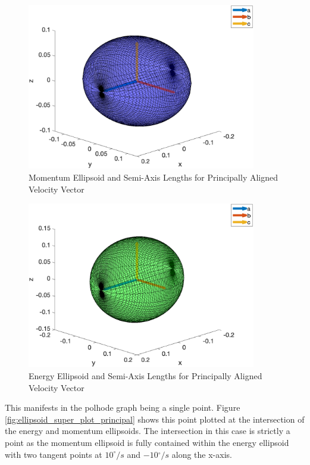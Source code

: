 \begin{figure}[H]
    \centering
    \includegraphics[width = 10cm]{Images/momentum_axes_principal.png}
    \caption{Momentum Ellipsoid and Semi-Axis Lengths for Principally Aligned Velocity Vector}
    \label{fig:momentum_axis_verification_princ}
\end{figure}

\begin{figure}[H]
    \centering
    \includegraphics[width = 10cm]{Images/energy_axes_principal.png}
    \caption{Energy Ellipsoid and Semi-Axis Lengths for Principally Aligned Velocity Vector}
    \label{fig:energy_axis_verification_princ}
\end{figure}

This manifests in the polhode graph being a single point. Figure \ref{fig:ellipsoid_super_plot_principal} shows this point plotted at the intersection of the energy and momentum ellipsoids. The intersection in this case is strictly a point as the momentum ellipsoid is fully contained within the energy ellipsoid with two tangent points at  $10^{\circ}/s$ and $-10{}^{\circ}/s$ along the x-axis. 

